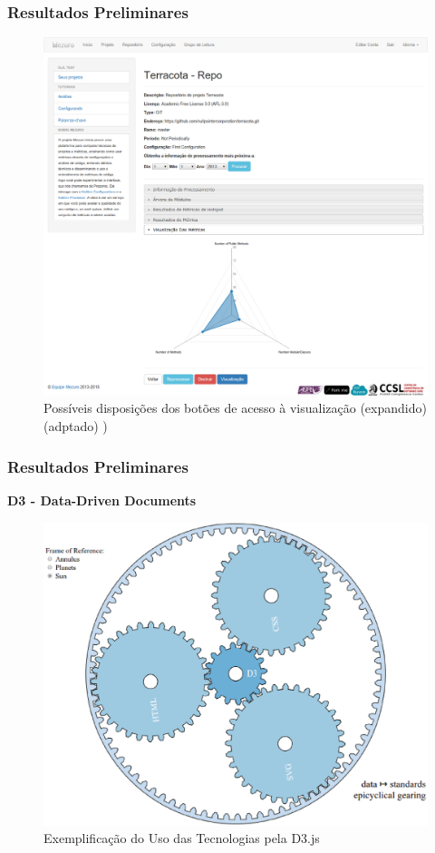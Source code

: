 \documentclass{beamer}
\begin{document}

\begin{frame}
\frametitle{Resultados Preliminares}
\begin{figure}[!htb]
  \centering
    \includegraphics[keepaspectratio=true,scale=0.155]
    {../figuras/exmplo_disposicao_botao_visualizacao_2.eps}
  \caption{Possíveis disposições dos botões de acesso à visualização
  (expandido) (adptado) \cite{filgueiras2014mezuro})}
  \label{fig:parallel}
\end{figure}
\end{frame}


\begin{frame}
\frametitle{Resultados Preliminares}
\textbf{D3 - Data-Driven Documents}
\begin{figure}[!htb]
  \centering
    \includegraphics[keepaspectratio=true,scale=0.28]
    {../figuras/d3_gears.eps}
  \caption{Exemplificação do Uso das Tecnologias pela D3.js \cite{michaeld3}}
  \label{fig:parallel}
\end{figure}
\end{frame}
\end{document}
